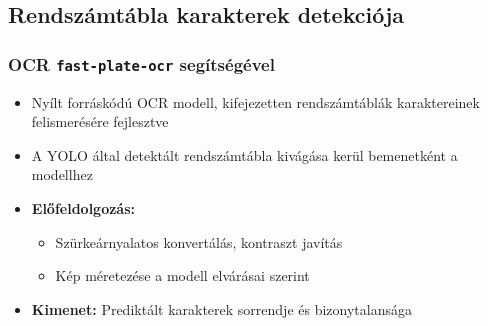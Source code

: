 \documentclass[aspectratio=169]{beamer}
\begin{document}
\subsection{Rendszámtábla karakterek detekciója}
\begin{frame}
	\frametitle{OCR \texttt{fast-plate-ocr} segítségével}

	\begin{itemize}
		\item Nyílt forráskódú OCR modell, kifejezetten rendszámtáblák karaktereinek felismerésére fejlesztve
		\item A YOLO által detektált rendszámtábla kivágása kerül bemenetként a modellhez
		\item \textbf{Előfeldolgozás:}
		      \begin{itemize}
			      \item Szürkeárnyalatos konvertálás, kontraszt javítás
			      \item Kép méretezése a modell elvárásai szerint
		      \end{itemize}
		\item \textbf{Kimenet:} Prediktált karakterek sorrendje és bizonytalansága
	\end{itemize}
\end{frame}
\end{document}
